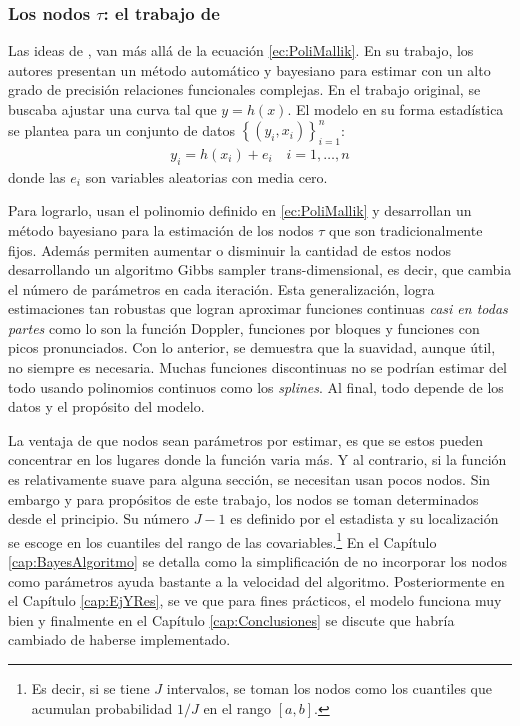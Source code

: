 \documentclass[../Main/Main.tex]{subfiles}
\begin{document}
\subsubsection*{Los nodos $\tau$: el trabajo de \citeauthor{mallik1998automatic}}
Las ideas de \citet{mallik1998automatic}, van más allá de la ecuación \eqref{ec:PoliMallik}. En su trabajo, los autores presentan un método automático y bayesiano para estimar con un alto grado de precisión relaciones funcionales complejas. En el trabajo original, se buscaba ajustar una curva tal que $y = h(x)$. El modelo en su forma estadística se plantea para un conjunto de datos $\left\{(y_i,x_i) \right\}_{i = 1}^n$:
\begin{align}
	y_i = h(x_i) + e_i \quad i = 1,\ldots,n
\end{align}
donde las $e_i$ son variables aleatorias con media cero.  

Para lograrlo, usan el polinomio definido en \eqref{ec:PoliMallik} y desarrollan un método bayesiano para la estimación de los nodos $\tau$ que son tradicionalmente fijos. Además permiten aumentar o disminuir la cantidad de estos nodos desarrollando un algoritmo Gibbs sampler trans-dimensional, es decir, que cambia el número de parámetros en cada iteración. Esta generalización, logra estimaciones tan robustas que logran aproximar funciones continuas \textit{casi en todas partes} como lo son la función Doppler, funciones por bloques y funciones con picos pronunciados. Con lo anterior, se demuestra que la suavidad, aunque útil, no siempre es necesaria. Muchas funciones discontinuas no se podrían estimar del todo usando polinomios continuos como los \textit{splines}. Al final, todo depende de los datos y el propósito del modelo.

La ventaja de que nodos sean parámetros por estimar, es que se estos pueden concentrar en los lugares donde la función varia más. Y al contrario, si la función es relativamente suave para alguna sección, se necesitan usan pocos nodos. Sin embargo y para propósitos de este trabajo, los nodos se toman determinados desde el principio. Su número $J-1$ es definido por el estadista y su localización se escoge en los cuantiles del rango de las covariables.\footnote{Es decir, si se tiene $J$ intervalos, se toman los nodos como los  cuantiles que acumulan probabilidad $1/J$ en el rango $[a,b]$.} En el Capítulo \ref{cap:BayesAlgoritmo} se detalla como la simplificación de no incorporar los nodos como parámetros ayuda bastante a la velocidad del algoritmo. Posteriormente en el Capítulo \ref{cap:EjYRes}, se ve que para fines prácticos, el modelo funciona muy bien y finalmente en el Capítulo \ref{cap:Conclusiones} se discute que habría cambiado de haberse implementado. 
\end{document}
